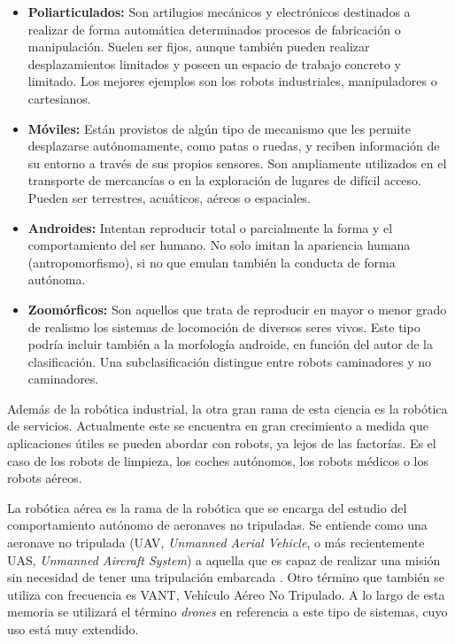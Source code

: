 \documentclass[../main.tex]{subfiles}
\begin{document}
\begin{itemize}
    \item \textbf{Poliarticulados:} Son artilugios mecánicos y electrónicos destinados a realizar de forma automática determinados procesos de fabricación o manipulación. Suelen ser fijos, aunque también pueden realizar desplazamientos limitados y poseen un espacio de trabajo concreto y limitado. Los mejores ejemplos son los robots industriales, manipuladores o cartesianos.
    \item \textbf{Móviles:} Están provistos de algún tipo de mecanismo que les permite desplazarse autónomamente, como patas o ruedas, y reciben información de su entorno a través de sus propios sensores. Son ampliamente utilizados en el transporte de mercancías o en la exploración de lugares de difícil acceso. Pueden ser terrestres, acuáticos, aéreos o espaciales.
    \item \textbf{Androides:} Intentan reproducir total o parcialmente la forma y el comportamiento del ser humano. No solo imitan la apariencia humana (antropomorfismo), si no que emulan también la conducta de forma autónoma.
    \item \textbf{Zoomórficos:} Son aquellos que trata de reproducir en mayor o menor grado de realismo los sistemas de locomoción de diversos seres vivos. Este tipo podría incluir también a la morfología androide, en función del autor de la clasificación. Una subclasificación distingue entre robots caminadores y no caminadores.
\end{itemize}

Además de la robótica industrial, la otra gran rama de esta ciencia es la robótica de servicios. Actualmente este se encuentra en gran crecimiento a medida que aplicaciones útiles se pueden abordar con robots, ya lejos de las factorías. Es el caso de los robots de limpieza, los coches autónomos, los robots médicos o los robots aéreos.

La robótica aérea es la rama de la robótica que se encarga del estudio del comportamiento autónomo de aeronaves no tripuladas. Se entiende como una aeronave no tripulada (UAV, \emph{Unmanned Aerial Vehicle}, o más recientemente UAS, \emph{Unmanned Aircraft System}) a aquella que es capaz de realizar una misión sin necesidad de tener una tripulación embarcada \cite{barrientos2007vehiculos}. Otro término que también se utiliza con frecuencia es VANT, Vehículo Aéreo No Tripulado. A lo largo de esta memoria se utilizará el término \emph{drones} en referencia a este tipo de sistemas, cuyo uso está muy extendido. \\
\end{document}
